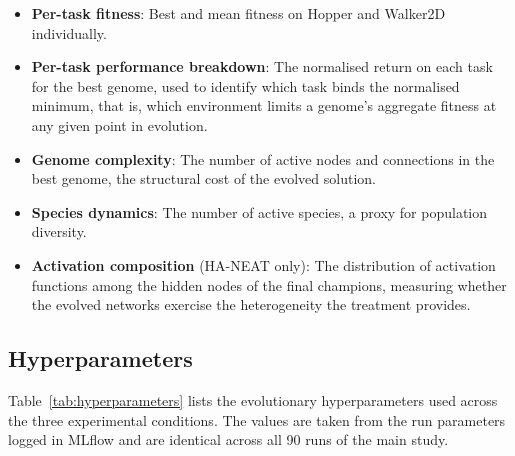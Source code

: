 \documentclass[12pt]{article}
\begin{document}
\begin{itemize}
    \item \textbf{Per-task fitness}: Best and mean fitness on Hopper and Walker2D individually.
    \item \textbf{Per-task performance breakdown}: The normalised return on each task for the best genome, used to identify which task binds the normalised minimum, that is, which environment limits a genome's aggregate fitness at any given point in evolution.
    \item \textbf{Genome complexity}: The number of active nodes and connections in the best genome, the structural cost of the evolved solution.
    \item \textbf{Species dynamics}: The number of active species, a proxy for population diversity.
    \item \textbf{Activation composition} (HA-NEAT only): The distribution of activation functions among the hidden nodes of the final champions, measuring whether the evolved networks exercise the heterogeneity the treatment provides.
\end{itemize}

\subsection{Hyperparameters}
\label{subsec:hyperparameters}

Table~\ref{tab:hyperparameters} lists the evolutionary hyperparameters used across the three experimental conditions.
The values are taken from the run parameters logged in MLflow and are identical across all 90 runs of the main study.
\end{document}
